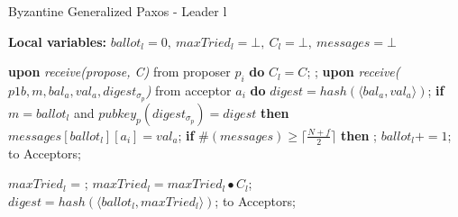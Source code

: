 \begin{algorithm}
	\caption{Byzantine Generalized Paxos - Leader l}
	\textbf{Local variables:} $ballot_l = 0,\ maxTried_l = \bot,\ C_l = \bot,\ messages = \bot$
	\begin{algorithmic}[1]
		\State \textbf{upon} \textit{receive(propose, C)} from proposer $p_i$ \textbf{do} 
		\State \hspace{\algorithmicindent} $C_l = C$;
		\State \hspace{\algorithmicindent} ;
		\State
		\State \textbf{upon} \textit{receive($p1b, m, bal_a, val_a, digest_{\sigma_p}$)} from acceptor $a_i$ \textbf{do}
		\State \hspace{\algorithmicindent} $digest = hash(\langle bal_a, val_a \rangle)$;
		\State \hspace{\algorithmicindent} \textbf{if} $m = ballot_l$ and $pubkey_p(digest_{\sigma_p}) = digest$ \textbf{then}
		\State \hspace{\algorithmicindent}\hspace{\algorithmicindent}\hspace{\algorithmicindent}  $messages[ballot_l][a_i] = val_a$;
		\State \hspace{\algorithmicindent} \textbf{if} $\#(messages) \geq \lceil \frac{N+f}{2}\rceil$ \textbf{then} 
		\State \hspace{\algorithmicindent}\hspace{\algorithmicindent} ;
		\State
		\State $ballot_l \mathrel{+{=}} 1$;
		\State {} to Acceptors;
		\EndFunction
		
		\State
		\State $maxTried_l$ = ;
		\State $maxTried_l = maxTried_l \bullet C_l$;
		\State $digest = hash(\langle ballot_l, maxTried_l \rangle)$;
		\State {} to Acceptors;
		\EndFunction
		

\end{algorithmic}
\end{algorithm}
